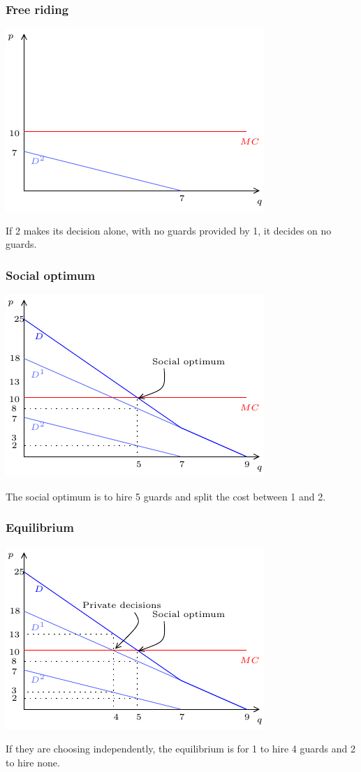 \documentclass[xcolor=pdftex,dvipsnames]{beamer}
\begin{document}
\begin{frame}
  \frametitle{Free riding}
  \begin{center}
    \includegraphics{pics/FreeRiding2}
  \end{center}
If 2 makes its decision alone, with no guards provided by 1, it
decides on no guards.
\end{frame}

\begin{frame}
  \frametitle{Social optimum}
  \begin{center}
    \includegraphics{pics/FreeRiding3}
  \end{center}
The social optimum is to hire 5 guards and split the cost between 1
and 2. 
\end{frame}

\begin{frame}
  \frametitle{Equilibrium}
  \begin{center}
    \includegraphics{pics/FreeRiding}
  \end{center}
If they are choosing independently, the equilibrium is for 1 to hire 4
guards and 2 to hire none. 
\end{frame}
\end{document}

